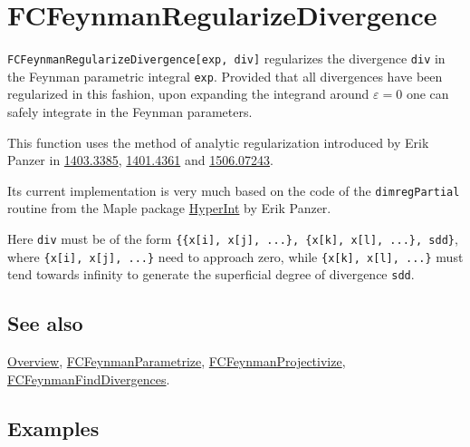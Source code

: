 \documentclass[../FeynCalcManual.tex]{subfiles}
\begin{document}
\hypertarget{fcfeynmanregularizedivergence}{%
\section{FCFeynmanRegularizeDivergence}\label{fcfeynmanregularizedivergence}}

\texttt{FCFeynmanRegularizeDivergence[\allowbreak{}exp,\ \allowbreak{}div]}
regularizes the divergence \texttt{div} in the Feynman parametric
integral \texttt{exp}. Provided that all divergences have been
regularized in this fashion, upon expanding the integrand around
\(\varepsilon = 0\) one can safely integrate in the Feynman parameters.

This function uses the method of analytic regularization introduced by
Erik Panzer in \href{https://arxiv.org/abs/1403.3385}{1403.3385},
\href{https://arxiv.org/abs/1401.4361}{1401.4361} and
\href{https://arxiv.org/abs/1506.07243}{1506.07243}.

Its current implementation is very much based on the code of the
\texttt{dimregPartial} routine from the Maple package
\href{https://bitbucket.org/PanzerErik/hyperint/}{HyperInt} by Erik
Panzer.

Here \texttt{div} must be of the form
\texttt{\{\allowbreak{}\{\allowbreak{}x[\allowbreak{}i],\ \allowbreak{}x[\allowbreak{}j],\ \allowbreak{}...\},\ \allowbreak{}\{\allowbreak{}x[\allowbreak{}k],\ \allowbreak{}x[\allowbreak{}l],\ \allowbreak{}...\},\ \allowbreak{}sdd\}},
where
\texttt{\{\allowbreak{}x[\allowbreak{}i],\ \allowbreak{}x[\allowbreak{}j],\ \allowbreak{}...\}}
need to approach zero, while
\texttt{\{\allowbreak{}x[\allowbreak{}k],\ \allowbreak{}x[\allowbreak{}l],\ \allowbreak{}...\}}
must tend towards infinity to generate the superficial degree of
divergence \texttt{sdd}.

\subsection{See also}

\hyperlink{toc}{Overview},
\hyperlink{fcfeynmanparametrize}{FCFeynmanParametrize},
\hyperlink{fcfeynmanprojectivize}{FCFeynmanProjectivize},
\hyperlink{fcfeynmanfinddivergences}{FCFeynmanFindDivergences}.

\subsection{Examples}
\end{document}
